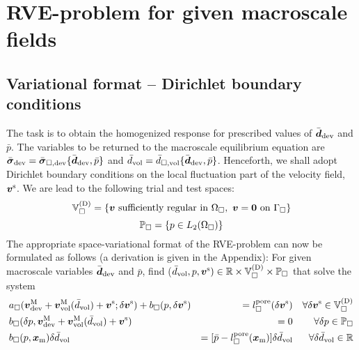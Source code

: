 \documentclass[10pt,a4paper]{article}
\newcommand{\pore}{\mathrm{pore}}
\begin{document}
\section{RVE-problem for given macroscale fields}\label{sec:rve_problem}


\subsection{Variational format -- Dirichlet boundary conditions}

The task is to obtain the homogenized response for prescribed values of $\bar{\boldsymbol{d}}_{\mathrm{dev}}$ and $\bar{p}$. The variables to be returned to the macroscale equilibrium equation are $\bar{\boldsymbol{\sigma}}_{\mathrm{dev}}=\bar{\boldsymbol{\sigma}}_{\Box,\mathrm{dev}}\{\bar{\boldsymbol{d}}_{\mathrm{dev}},\bar{p}\}$ and $\bar{d}_{\mathrm{vol}}=\bar{d}_{\Box,\mathrm{vol}}\{\bar{\boldsymbol{d}}_{\mathrm{dev}}, \bar{p}\}$. Henceforth, we shall adopt Dirichlet boundary conditions on the local fluctuation part of the velocity field, $\boldsymbol{v}^{\mathrm{s}}$. We are lead to the following trial and test spaces:
\begin{equation}
    \mathbb{V}_\Box^{(\mathrm{D})} = \{\boldsymbol{v} \mbox{ sufficiently regular in } \Omega_\Box, \,\, \boldsymbol{v}=\boldsymbol{0}\,\,\mbox{on}\,\,\Gamma_\Box\}
\label{eq212}
\end{equation}
\begin{equation}
    \mathbb{P}_\Box = \{p\in L_2(\Omega_\Box)\}
\label{eq212}
\end{equation}
The appropriate space-variational format of the RVE-problem can now be formulated as follows (a derivation is given in the Appendix): For given macroscale variables $\bar{\boldsymbol{d}}_{\mathrm{dev}}$ and $\bar{p}$,
find ($\bar{d}_{\mathrm{vol}},p,\boldsymbol{v}^{\mathrm{s}})\in\mathbb{R}\times\mathbb{V}_\Box^{(\mathrm{D})}\times\mathbb{P}_\Box$ that solve the system
\begin{align}
    \label{eq213a} & a_\Box(\ta{v}^\macro_\dev + \ta{v}^\macro_\vol(\bar{d}_\vol)+\ta{v}^\fluct;\delta \ta{v}^\fluct) +  b_\Box(p,\delta\ta{v}^\fluct)
    & =
    l^\pore_\Box(\delta \ta{v}^\fluct)
    && \forall \delta \ta{v}^\fluct\in\set{V}_\Box^{(\Dirichlet)}
 \\
    \label{eq213b} & b_\Box(\delta p,\ta{v}^\macro_\dev + \ta{v}^\macro_\vol(\bar{d}_\vol)+\ta{v}^\fluct)
    & =
    0
    && \forall \delta p\in\set{P}_\Box
\\
    \label{eq213c} & b_\Box(p,\ta{x}_\mean)\delta\bar{d}_\vol
    & =
    [\bar{p} - l_\Box^\pore(\ta{x}_\mean)]\delta\bar{d}_\vol
    && \forall \delta\bar{d}_\vol  \in \set{R}
\end{align}
\end{document}

